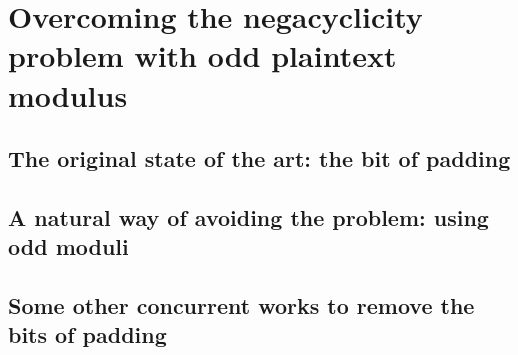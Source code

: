 \chapter{Overcoming the negacyclicity problem with odd plaintext modulus}


\section{The original state of the art: the bit of padding}


\section{A natural way of avoiding the problem: using odd moduli}


\section{Some other concurrent works to remove the bits of padding}





